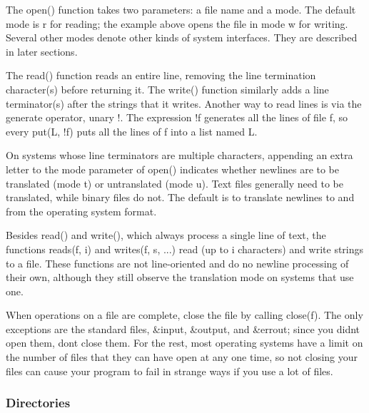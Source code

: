 
The \textsf{open()} function takes two parameters: a file
name and a mode. The default mode is
\textsf{{\textquotedbl}r{\textquotedbl}} for reading; the example above
opens the file in mode \textsf{{\textquotedbl}w{\textquotedbl}} for
writing. Several other modes denote other kinds of system interfaces.
They are described in later sections.

The \textsf{read()} function reads an entire line, removing the line
termination character(s) before returning it. The \textsf{write()}
function similarly adds a line terminator(s) after the strings that it
writes. Another way to read lines is via the generate operator, unary
\textsf{!}. The expression \textsf{!f} generates all the lines of file
\textsf{f}, so \textsf{every put(L, !f)} puts all the lines of
\textsf{f} into a list named \textsf{L}.

On systems whose line terminators are multiple characters, appending an
extra letter to the mode parameter of \textsf{open()} indicates whether
newlines are to be translated (mode
\textsf{{\textquotedbl}t{\textquotedbl}}) or untranslated (mode
\textsf{{\textquotedbl}u{\textquotedbl}}). Text files generally need to
be translated, while binary files do not. The default is to translate
newlines to and from the operating system format.

Besides \textsf{read()} and \textsf{write()}, which always process a
single line of text, the functions \textsf{reads(f, i)} and
\textsf{writes(f, s, ...)} read (up to \textsf{i} characters) and write
strings to a file. These functions are not line-oriented and do no
newline processing of their own, although they still observe the
translation mode on systems that use one.

When operations on a file are complete, close the file by calling
\textsf{close(f)}. The only exceptions are the standard
files, \textsf{\&input}, \textsf{\&output}, and \textsf{\&errout};
since you didn{\textquotesingle}t open them, don{\textquotesingle}t
close them. For the rest, most operating systems have a limit on the
number of files that they can have open at any one time, so not closing
your files can cause your program to fail in strange ways if you use a
lot of files.

\subsubsection{Directories}

